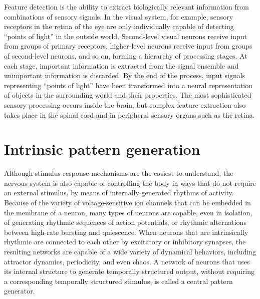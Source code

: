 Feature detection is the ability to extract biologically relevant information from combinations of sensory signals. In the visual system, for example, sensory receptors in the retina of the eye are only individually capable of detecting ``points of light'' in the outside world. Second-level visual neurons receive input from groups of primary receptors, higher-level neurons receive input from groups of second-level neurons, and so on, forming a hierarchy of processing stages. At each stage, important information is extracted from the signal ensemble and unimportant information is discarded. By the end of the process, input signals representing ``points of light'' have been transformed into a neural representation of objects in the surrounding world and their properties. The most sophisticated sensory processing occurs inside the brain, but complex feature extraction also takes place in the spinal cord and in peripheral sensory organs such as the retina.

\hypertarget{intrinsic-pattern-generation}{%
\section{Intrinsic pattern generation}\label{intrinsic-pattern-generation}}

Although stimulus-response mechanisms are the easiest to understand, the nervous system is also capable of controlling the body in ways that do not require an external stimulus, by means of internally generated rhythms of activity. Because of the variety of voltage-sensitive ion channels that can be embedded in the membrane of a neuron, many types of neurons are capable, even in isolation, of generating rhythmic sequences of action potentials, or rhythmic alternations between high-rate bursting and quiescence. When neurons that are intrinsically rhythmic are connected to each other by excitatory or inhibitory synapses, the resulting networks are capable of a wide variety of dynamical behaviors, including attractor dynamics, periodicity, and even chaos. A network of neurons that uses its internal structure to generate temporally structured output, without requiring a corresponding temporally structured stimulus, is called a central pattern generator.

